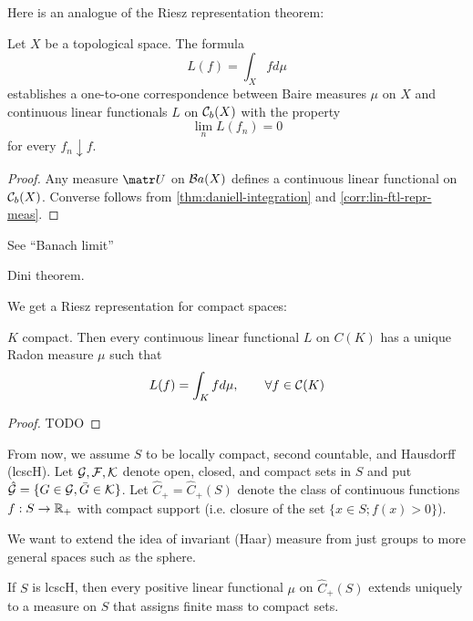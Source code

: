 Here is an analogue of the Riesz representation theorem:

\begin{theorem}
  Let $X$ be a topological space. The formula
  \[
    L(f) = \int_X f d\mu
  \]
  establishes a one-to-one correspondence between Baire measures $\mu$
  on $X$ and continuous linear functionals $L$ on $\mathcal{C}_b(X)$ with
  the property
  \[
    \lim_n L(f_n) = 0
  \]
  for every $f_n \downarrow f$.
\end{theorem}

\begin{proof}
  Any measure $\mU$ on $\mathcal{B}a(X)$ defines a continuous linear functional
  on $\mathcal{C}_b(X)$. Converse follows from \cref{thm:daniell-integration}
  and \cref{corr:lin-ftl-repr-meas}.
\end{proof}

See ``Banach limit''

Dini theorem.

We get a Riesz representation for compact spaces:

\begin{theorem}
  $K$ compact. Then every continuous linear functional $L$ on
  $C(K)$ has a unique Radon measure $\mu$ such that
  \begin{align*}
    L(f) = \int_K f d\mu, \qquad \forall f \in \mathcal{C}(K)
  \end{align*}
\end{theorem}

\begin{proof}
  TODO
\end{proof}

From now, we assume $S$ to be locally compact, second countable, and Hausdorff
(lcscH). Let $\mathcal{G}, \mathcal{F}, \mathcal{K}$ denote open, closed, and compact sets in
$S$
and put $\hat{\mathcal{G}} = \{ G \in \mathcal{G}, \bar{G} \in \mathcal{K}\}$.
Let $\hat{C}_+ = \hat{C}_+(S)$ denote the class of continuous functions
$f : S \to \mathbb{R}_+$ with compact support (i.e.
closure of the set $\{x \in S; f(x) > 0\}$).

We want to extend the idea of invariant (Haar) measure from just groups
to more general spaces such as the sphere.

\begin{theorem}
  \label{thm:riesz-extend-fts-to-meas}
  If $S$ is lcscH, then every positive linear functional $\mu$
  on $\hat{C}_+(S)$ extends uniquely to a measure on $S$ that assigns
  finite mass to compact sets.
\end{theorem}


